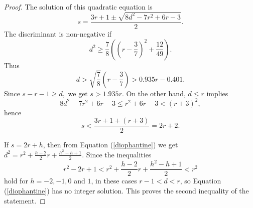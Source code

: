 \documentclass[10pt,a4paper]{amsart}
\begin{document}
\begin{proof}
The solution of this quadratic equation is
$$s=\frac{3r+1\pm \sqrt{8d^2-7r^2+6r-3}}{2}.$$
The discriminant is non-negative if 
$$d^2\geq \frac{7}{8}\left( \left( r-\frac{3}{7}\right) ^2+\frac{12}{49}\right) .$$
Thus 
$$d>\sqrt{\frac{7}{8}}\left( r-\frac{3}{7}\right)> 0.935r-0.401 .$$
Since $s-r-1\geq d,$ we get $s>1.935r.$
On the other hand, $d\leq r$ implies 
$$8d^2-7r^2+6r-3\leq r^2+6r-3 < (r+3)^2,$$
hence 
$$s < \frac{3r+1+(r+3)}{2}=2r+2.$$

If $s=2r+h$, then from Equation (\ref{diophantine}) we get
$d^2=r^2+\frac{h-2}{2}r+\frac{h^2-h+1}{2}$. Since the inequalities 
$$r^2-2r+1< r^2+\frac{h-2}{2}r+\frac{h^2-h+1}{2}< r^2$$
hold for $h=-2,-1,0$ and $1$, in these cases $r-1<d<r$, so Equation (\ref{diophantine}) has no integer solution. This proves the second inequality of the statement.
\end{proof}
\end{document}

